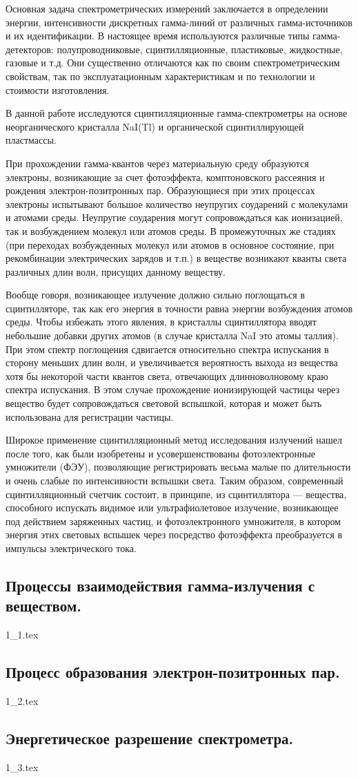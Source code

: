 Основная задача спектрометрических измерений заключается в определении энергии,
интенсивности дискретных гамма-линий от различных гамма-источников и их
идентификации. В настоящее время используются различные типы гамма-детекторов:
полупроводниковые, сцинтилляционные, пластиковые, жидкостные, газовые и т.д. Они
существенно отличаются как по своим спектрометрическим свойствам, так по
эксплуатационным характеристикам и по технологии и стоимости изготовления.

В данной работе исследуются сцинтилляционные гамма-спектрометры на основе
неорганического кристалла NaI(Tl) и органической сцинтиллирующей пластмассы.

При прохождении гамма-квантов через материальную среду образуются электроны,
возникающие за счет фотоэффекта, комптоновского рассеяния и рождения
электрон-позитронных пар. Образующиеся при этих процессах электроны испытывают
большое количество неупругих соударений с молекулами и атомами среды. Неупругие
соударения могут сопровождаться как ионизацией, так и возбуждением молекул или
атомов среды. В промежуточных же стадиях (при переходах возбужденных молекул или
атомов в основное состояние, при рекомбинации электрических зарядов и т.п.) в
веществе возникают кванты света различных длин волн, присущих данному веществу.

Вообще говоря, возникающее излучение должно сильно поглощаться в сцинтилляторе,
так как его энергия в точности равна энергии возбуждения атомов среды. Чтобы
избежать этого явления, в кристаллы сцинтиллятора вводят небольшие добавки
других атомов (в случае кристалла NaI это атомы таллия). При этом спектр
поглощения сдвигается относительно спектра испускания в сторону меньших длин
волн, и увеличивается вероятность выхода из вещества хотя бы некоторой части
квантов света, отвечающих длинноволновому краю спектра испускания. В этом случае
прохождение ионизирующей частицы через вещество будет сопровождаться световой
вспышкой, которая и может быть использована для регистрации частицы.

Широкое применение сцинтилляционный метод исследования излучений нашел после
того, как были изобретены и усовершенствованы фотоэлектронные умножители (ФЭУ),
позволяющие регистрировать весьма малые по длительности и очень слабые по
интенсивности вспышки света. Таким образом, современный сцинтилляционный счетчик
состоит, в принципе, из сцинтиллятора — вещества, способного испускать видимое
или ультрафиолетовое излучение, возникающее под действием заряженных частиц, и
фотоэлектронного умножителя, в котором энергия этих световых вспышек через
посредство фотоэффекта преобразуется в импульсы электрического тока.

\newpage
\subsection{Процессы взаимодействия гамма-излучения с веществом.}
{1_1.tex}

\newpage
\subsection{Процесс образования электрон-позитронных пар.}
{1_2.tex}

\newpage
\subsection{Энергетическое разрешение спектрометра.}
{1_3.tex}